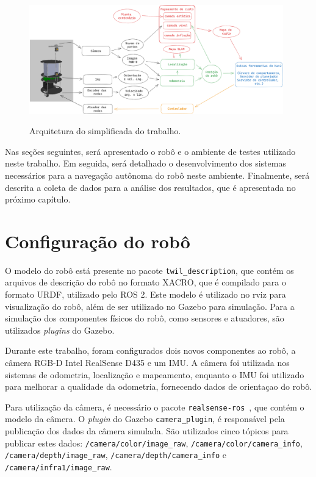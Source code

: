 \documentclass[repeatfields,xlists,xpacks,oneside,yearsonly]{ufrgscca}
\begin{document}
\begin{figure}[h]
    {
        \centering
        \caption{Arquitetura do simplificada do trabalho.}
        \label{fig:arq_trabalho}
        \includegraphics[width=0.98\textwidth]{arquitetura_simplificadav3.png}\\
    }
\end{figure}

Nas seções seguintes, será apresentado o robô e o ambiente de testes
utilizado neste trabalho.
Em seguida, será detalhado o desenvolvimento dos sistemas necessários
para a navegação autônoma do robô neste ambiente.
Finalmente, será descrita a coleta de dados para a análise dos resultados,
que é apresentada no próximo capítulo.

\section{Configuração do robô}



O modelo do robô está presente no pacote \texttt{twil\_description}, que contém
os arquivos de descrição do robô no formato XACRO, que é compilado para o formato
URDF, utilizado pelo ROS 2.
Este modelo é utilizado no rviz para visualização do robô, além de ser utilizado
no Gazebo para simulação.
Para a simulação dos componentes físicos do robô, como sensores e atuadores,
são utilizados \textit{plugins} do Gazebo.

Durante este trabalho, foram configurados dois novos componentes ao robô, a câmera
RGB-D Intel RealSense D435 e um IMU.
A câmera foi utilizada nos sistemas de odometria, localização e mapeamento,
enquanto o IMU foi utilizado para melhorar a qualidade da odometria,
fornecendo dados de orientaçao do robô.

Para utilização da câmera, é necessário o pacote
\texttt{realsense-ros}~\cite{realsense_ros}, que contém o modelo da câmera.
O \textit{plugin} do Gazebo \texttt{camera\_plugin},
é responsável pela publicação dos dados da câmera simulada.
São utilizados cinco tópicos para publicar estes dados:
\texttt{/camera/color/image\_raw}, \texttt{/camera/color/camera\_info},
\texttt{/camera/depth/image\_raw}, \texttt{/camera/depth/camera\_info} e
\texttt{/camera/infra1/image\_raw}.
\end{document}

